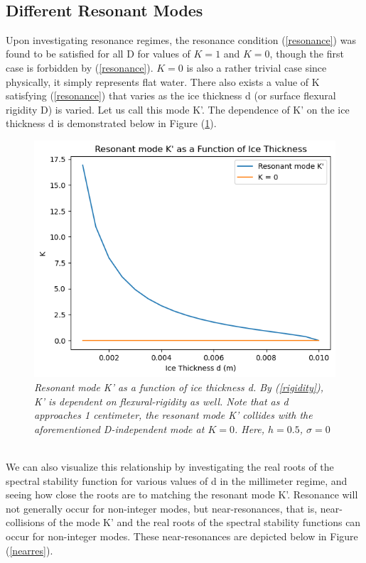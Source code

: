 \documentclass{article}
\begin{document}
\\

\clearpage

\subsection{Different Resonant Modes}

Upon investigating resonance regimes, the resonance condition (\ref{resonance}) was found to be satisfied for all D for values of \(K = 1\) and \(K = 0\), though the first case is forbidden by (\ref{resonance}). \(K = 0\) is also a rather trivial case since physically, it simply represents flat water. There also exists a value of K satisfying (\ref{resonance}) that varies as the ice thickness d (or surface flexural rigidity D) is varied. Let us call this mode K'. The dependence of K' on the ice thickness d is demonstrated below in Figure (\ref{Kmode}).  \\

\begin{figure}[hbt!]
\centering
\includegraphics[scale = .8]{Resonant.png}
\caption{\emph{Resonant mode K' as a function of ice thickness d. By (\ref{rigidity}), K' is dependent on flexural-rigidity as well. Note that as d approaches 1 centimeter, the resonant mode K' collides with the aforementioned D-independent mode at \(K = 0\). Here, \(h = 0.5\), \(\sigma = 0\)}} \label{Kmode}
\end{figure}
\\

We can also visualize this relationship by investigating the real roots of the spectral stability function for various values of d in the millimeter regime, and seeing how close the roots are to matching the resonant mode K'. Resonance will not generally occur for non-integer modes, but near-resonances, that is, near-collisions of the mode K' and the real roots of the spectral stability functions can occur for non-integer modes. These near-resonances are depicted below in Figure (\ref{nearres}).
\\
\end{document}
